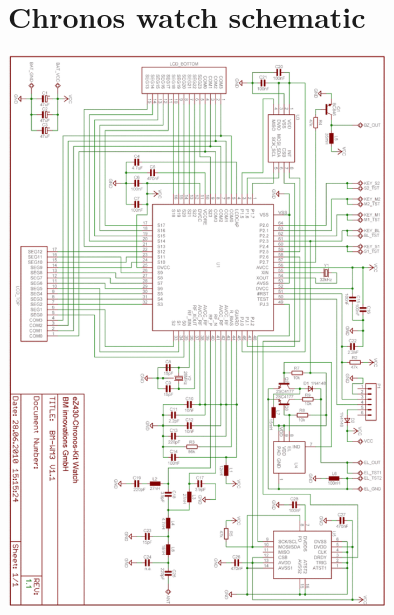 
\chapter{Chronos watch schematic}
\label{appendix:watch_schematics}

\centering
\includegraphics[width=0.75\textwidth]{img/watch_schematics.png}


% 



